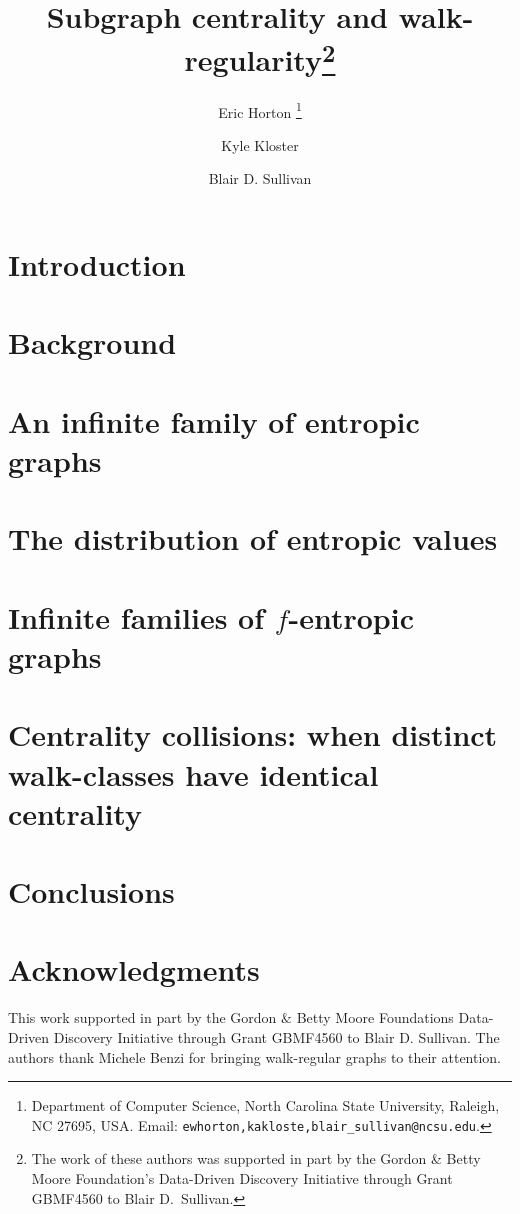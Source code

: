 \documentclass[12pt]{article}
\title{Subgraph centrality and walk-regularity\thanks{The work of these authors was supported in part by the Gordon \& Betty Moore Foundation's Data-Driven Discovery Initiative through Grant GBMF4560 to Blair D.~Sullivan.}}
\author{
    Eric Horton
    \thanks{Department of Computer Science, North Carolina State University, Raleigh, NC 27695, USA. Email:
    \texttt{ewhorton,kakloste,blair\_sullivan@ncsu.edu}.
}
\and Kyle Kloster\footnotemark[2]
\and Blair D. Sullivan\footnotemark[2]}
\begin{document}
\maketitle

\begin{abstract}
  
\end{abstract}

\section{Introduction}\label{sec:intro}


\section{Background}\label{sec:prelims}\label{sec:notation}


\section{An infinite family of entropic graphs}\label{sec:cartesian-graph}


\section{The distribution of entropic values}\label{sec:beta-distribution}


\section{Infinite families of $f$-entropic graphs}\label{sec:infinite-tensor}


\section{Centrality collisions: when distinct walk-classes have identical centrality}\label{sec:constructing-entropic}


\section{Conclusions}\label{sec:conclusions}


\section*{Acknowledgments}

This work supported in part by the Gordon $\&$ Betty Moore Foundations Data-Driven Discovery
Initiative through Grant GBMF4560 to Blair D. Sullivan.
The authors thank Michele Benzi for bringing walk-regular graphs to their attention.




\appendix

\end{document}
